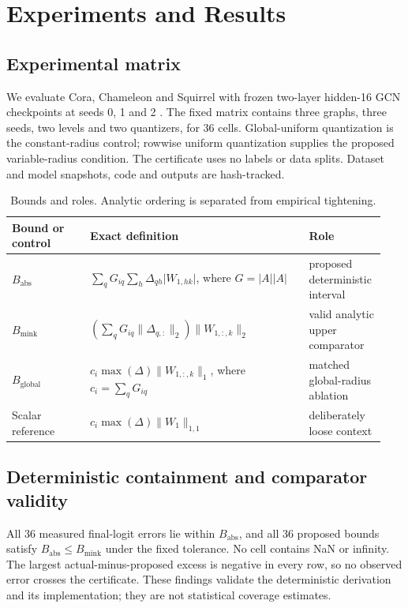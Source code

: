 \documentclass{article}
\begin{document}
\section{Experiments and Results}


\subsection{Experimental matrix}


We evaluate Cora, Chameleon and Squirrel with frozen two-layer hidden-16 GCN checkpoints at seeds 0, 1 and 2 \cite{yang2016planetoid,pei2020geomgnn,platonov2023heterophily}. The fixed matrix contains three graphs, three seeds, two levels and two quantizers, for 36 cells. Global-uniform quantization is the constant-radius control; rowwise uniform quantization supplies the proposed variable-radius condition. The certificate uses no labels or data splits. Dataset and model snapshots, code and outputs are hash-tracked.

\begin{table}[ht]
\centering
\caption{Bounds and roles. Analytic ordering is separated from empirical tightening.}
\begin{tabular}{p{0.20\linewidth}p{0.56\linewidth}p{0.18\linewidth}}
\toprule
\textbf{Bound or control} & \textbf{Exact definition} & \textbf{Role} \\
\midrule
\(B_{\mathrm{abs}}\) & \(\sum_q G_{iq}\sum_h \Delta_{qh}\lvert W_{1,hk}\rvert\), where \(G=\lvert A\rvert\lvert A\rvert\) & proposed deterministic interval \\
\(B_{\mathrm{mink}}\) & \(\left(\sum_q G_{iq}\lVert\Delta_{q,:}\rVert_2\right)\lVert W_{1,:,k}\rVert_2\) & valid analytic upper comparator \\
\(B_{\mathrm{global}}\) & \(c_i\max(\Delta)\lVert W_{1,:,k}\rVert_1\), where \(c_i=\sum_qG_{iq}\) & matched global-radius ablation \\
Scalar reference & \(c_i\max(\Delta)\lVert W_1\rVert_{1,1}\) & deliberately loose context \\
\bottomrule
\end{tabular}
\end{table}

\subsection{Deterministic containment and comparator validity}


All 36 measured final-logit errors lie within \(B_{\mathrm{abs}}\), and all 36 proposed bounds satisfy \(B_{\mathrm{abs}}\le B_{\mathrm{mink}}\) under the fixed tolerance. No cell contains NaN or infinity. The largest actual-minus-proposed excess is negative in every row, so no observed error crosses the certificate. These findings validate the deterministic derivation and its implementation; they are not statistical coverage estimates.
\end{document}

